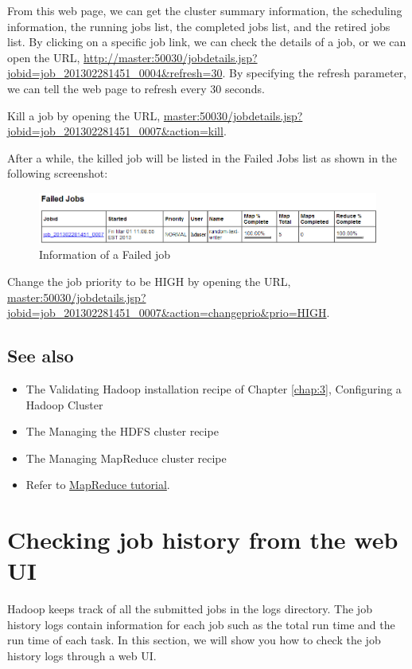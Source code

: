 From this web page, we can get the cluster summary information, the scheduling information, the running jobs list, the completed jobs list, and the retired jobs list. By clicking on a specific job link, we can check the details of a job, or we can open the URL, \url{http://master:50030/jobdetails.jsp?jobid=job_201302281451_0004&refresh=30}. By specifying the refresh parameter, we can tell the web page to refresh every 30 seconds.

Kill a job by opening the URL, \url{master:50030/jobdetails.jsp?jobid=job_201302281451_0007&action=kill}.

After a while, the killed job will be listed in the Failed Jobs list as shown in the following screenshot:
\begin{figure}[h]
  \centering
  \includegraphics[width=\textwidth]{figs/5163os_04_12.png}
  \caption{Information of a Failed job}\label{fig:failed.job}
\end{figure} 

Change the job priority to be HIGH by opening the URL, \url{master:50030/jobdetails.jsp?jobid=job_201302281451_0007&action=changeprio&prio=HIGH}. \\
\subsection*{See also}
\begin{itemize}
  \item The Validating Hadoop installation recipe of Chapter \ref{chap:3}, Configuring a Hadoop Cluster
  \item The Managing the HDFS cluster recipe
  \item The Managing MapReduce cluster recipe
  \item Refer to \href{http://hadoop.apache.org/docs/r1.1.2/mapred_tutorial.html}{MapReduce tutorial}.
\end{itemize}

\section{Checking job history from the web UI}
Hadoop keeps track of all the submitted jobs in the logs directory. The job history logs contain information for each job such as the total run time and the run time of each task. In this section, we will show you how to check the job history logs through a web UI.
